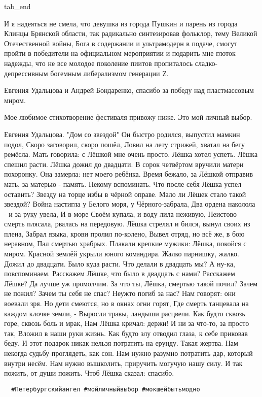 tab_end
\fi

И я надеяться не смела, что девушка из города Пушкин и парень из города Клинцы
Брянской области, так радикально синтезировав фольклор, тему Великой
Отечественной войны, Бога в содержании и ультрамодерн в подаче, смогут пройти в
победители на официальном мероприятии и подарить мне глоток надежды, что не все
молодое поколение пиитов пропиталось сладко-депрессивным богемным либерализмом
генерации Z. 

Евгения Удальцова и Андрей Бондаренко, спасибо за победу над пластмассовым миром. 

Мое любимое стихотворение фестиваля привожу ниже. Это мой личный выбор.

Евгения Удальцова. "Дом со звездой"
Он быстро родился, выпустил мамкин подол, 
Скоро заговорил, скоро пошёл, 
Ловил на лету стрижей, хватал на бегу ремёсла. 
Мать говорила: с Лёшкой мне очень просто. 
Лёшка хотел успеть. Лёшка спешил расти. 
Лёшка дожил до двадцати. 
В сорок четвёртом вручили матери похоронку. 
Она замерла: нет моего ребёнка. 
Время бежало, за Лёшкой отправив мать, 
за матерью - память. Некому вспоминать. 
Что после себя Лёшка успел оставить? 
Звезду на торце избы в чёрной оправе. 
Мало ли Лёшек стало такой звездой? 
Война настигла у Белого моря, у Чёрного-забрала, 
Два ордена наколола - и за руку увела, 
И в море Своём купала, и воду лила неживую, 
Неистово смерть плясала, рвалась на передовую. 
Лёшка стрелял и бился, вынул своих из плена, 
Забрал языка, крови пролил по-колено, 
Вывел отряд, но всё же, в бою неравном, 
Пал смертью храбрых. 
Плакали крепкие мужики: Лёшка, покойся с миром. 
Красной землёй укрыли юного командира. 
Жалко парнишку, жалко. 
Дожил до двадцати. 
Было куда расти. 
Что делали в двадцать мы? А ну-ка, повспоминаем. 
Расскажем Лёшке, что было в двадцать с нами? 
Расскажем Лёшке? Да лучше уж промолчим. 
За что ты, Лёшка, смертью такой почил? 
Зачем не пожил? Зачем ты себя не спас? 
Неужто погиб за нас? 
Нам говорят: они воевали зря. 
Но дети смеются, но в окнах огни горят, 
Где смерть танцевала на каждом клочке земли, - 
Выросли травы, ландыши расцвели. 
Как будто сквозь горе, сквозь боль и мрак, 
Нам Лёшка кричал: держи! 
И ни за что-то, за просто так, 
Вложил в наши руки жизнь. 
Как будто злу отводил глаза, к себе приковав беду. 
И этот подарок никак нельзя потратить на ерунду. 
Такая жертва. Нам некогда судьбу проглядеть, как сон. 
Нам нужно разумно потратить дар, который внутри несём. 
Нам нужно вышколить, приручить могучую нашу силу. 
И так пожить, от души пожить. 
Чтоб Лёшка сказал: спасибо.

\begin{verbatim}
  #Петербургскийангел #мойличныйвыбор #мокшейбытьмодно
\end{verbatim}
